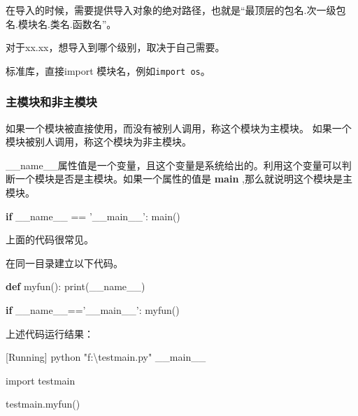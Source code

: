 \documentclass[12pt]{ctexart}
\newenvironment{Shaded}{}{}
\newcommand{\KeywordTok}[1]{\textcolor[rgb]{0.00,0.44,0.13}{\textbf{{#1}}}}
\newcommand{\CharTok}[1]{\textcolor[rgb]{0.25,0.44,0.63}{{#1}}}
\newcommand{\StringTok}[1]{\textcolor[rgb]{0.25,0.44,0.63}{{#1}}}
\newcommand{\NormalTok}[1]{{#1}}
\newcommand{\ImportTok}[1]{{#1}}
\newcommand{\VariableTok}[1]{\textcolor[rgb]{0.10,0.09,0.49}{{#1}}}
\newcommand{\ControlFlowTok}[1]{\textcolor[rgb]{0.00,0.44,0.13}{\textbf{{#1}}}}
\newcommand{\OperatorTok}[1]{\textcolor[rgb]{0.40,0.40,0.40}{{#1}}}
\newcommand{\BuiltInTok}[1]{{#1}}
\begin{document}
在导入的时候，需要提供导入对象的绝对路径，也就是``最顶层的包名.次一级包名.模块名.类名.函数名''。

对于xx.xx，想导入到哪个级别，取决于自己需要。

标准库，直接import 模块名，例如\texttt{import\ os}。

    \hypertarget{ux4e3bux6a21ux5757ux548cux975eux4e3bux6a21ux5757}{%
\subsubsection{主模块和非主模块}\label{ux4e3bux6a21ux5757ux548cux975eux4e3bux6a21ux5757}}

如果一个模块被直接使用，而没有被别人调用，称这个模块为主模块。
如果一个模块被别人调用，称这个模块为非主模块。

\_\_name\_\_属性值是一个变量，且这个变量是系统给出的。利用这个变量可以判断一个模块是否是主模块。如果一个属性的值是
\textbf{main} ,那么就说明这个模块是主模块。

    \begin{Shaded}
\begin{Highlighting}[]
\ControlFlowTok{if} \VariableTok{__name__} \OperatorTok{==} \StringTok{'__main__'}\NormalTok{:}
\NormalTok{    main()}
\end{Highlighting}
\end{Shaded}

上面的代码很常见。

在同一目录建立以下代码。

\begin{Shaded}
\begin{Highlighting}[]
\KeywordTok{def}\NormalTok{ myfun():}
    \BuiltInTok{print}\NormalTok{(}\VariableTok{__name__}\NormalTok{)}

\ControlFlowTok{if} \VariableTok{__name__}\OperatorTok{==}\StringTok{'__main__'}\NormalTok{:}
\NormalTok{    myfun()}
\end{Highlighting}
\end{Shaded}

上述代码运行结果：

\begin{Shaded}
\begin{Highlighting}[]
\NormalTok{[Running] python }\StringTok{"f:}\CharTok{\textbackslash{}t}\StringTok{estmain.py"}
\NormalTok{__main__}
\end{Highlighting}
\end{Shaded}

\begin{Shaded}
\begin{Highlighting}[]
\ImportTok{import}\NormalTok{ testmain}

\NormalTok{testmain.myfun()}
\end{Highlighting}
\end{Shaded}
\end{document}
